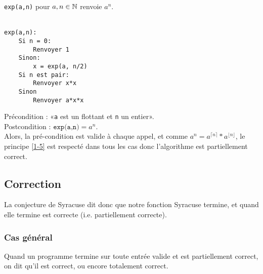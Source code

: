 \begin{example}
	\texttt{exp(a,n)} pour $a,n\in \mathbb{N}$ renvoie $a^n$.\\\\
	\begin{minipage}{0.5\linewidth}
		\begin{lstlisting}
exp(a,n):
    Si n = 0:
        Renvoyer 1
    Sinon:
        x = exp(a, n/2)
    Si n est pair:
        Renvoyer x*x
    Sinon
        Renvoyer a*x*x
		\end{lstlisting}
	\end{minipage} \quad \begin{minipage}{0.4\linewidth}
		Précondition : «\texttt a est un flottant et \texttt n un entier».\\
		Postcondition : $\texttt{exp(a,n)} = a^n$.\\
		Alors, la pré-condition est valide à chaque appel, et comme $a^n = a^{\lceil n \rceil} * a^{\lfloor n \rfloor}$, le principe \ref{1-5} est respecté dans tous les cas donc l'algorithme est partiellement correct.
	\end{minipage}
\end{example}

\subsection{Correction}

La conjecture de Syracuse dit donc que notre fonction Syracuse termine, et quand elle termine est correcte (i.e. partiellement correcte).

\subsubsection{Cas général}

\begin{definition}
	Quand un programme termine sur toute entrée valide et est partiellement correct, on dit qu'il est correct, ou encore totalement correct.
\end{definition}

